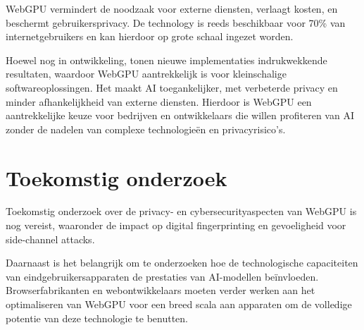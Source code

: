 \documentclass[a0,portrait]{hogent-poster}
\begin{document}
\begin{multicols}{2}
WebGPU vermindert de noodzaak voor externe diensten, verlaagt kosten, en beschermt gebruikersprivacy. De technology is reeds beschikbaar voor 70\% van internetgebruikers en kan hierdoor op grote schaal ingezet worden.

Hoewel nog in ontwikkeling, tonen nieuwe implementaties indrukwekkende resultaten, waardoor WebGPU aantrekkelijk is voor kleinschalige softwareoplossingen. Het maakt AI toegankelijker, met verbeterde privacy en minder afhankelijkheid van externe diensten. Hierdoor is WebGPU een aantrekkelijke keuze voor bedrijven en ontwikkelaars die willen profiteren van AI zonder de nadelen van complexe technologieën en privacyrisico's.

\section{Toekomstig onderzoek}

Toekomstig onderzoek over de privacy- en cybersecurityaspecten van WebGPU is nog vereist, waaronder de impact op digital fingerprinting en gevoeligheid voor side-channel attacks.

Daarnaast is het belangrijk om te onderzoeken hoe de technologische capaciteiten van eindgebruikersapparaten de prestaties van AI-modellen beïnvloeden. Browserfabrikanten en webontwikkelaars moeten verder werken aan het optimaliseren van WebGPU voor een breed scala aan apparaten om de volledige potentie van deze technologie te benutten.

\end{multicols}
\end{document}
